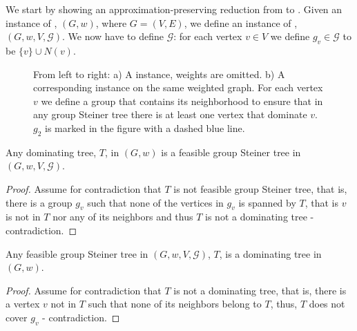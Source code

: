 We start by showing an approximation-preserving reduction from \Prob{} to
\ProbGroup{}.
Given an instance of \Prob{}, $(G, w)$, where $G = (V, E)$, 
we define an instance of \ProbGroup{},
$(G, w, V, \mathcal{G})$.
We now have to define $\mathcal{G}$: for each vertex $v \in V$ we define 
$g_v \in \mathcal{G}$ to be $\{v\} \cup N(v)$.

\begin{figure}
\begin{center}

\end{center}
\caption{\label{fig:prob-leq-group}
From left to right:
a) A \Prob{} instance, weights are omitted.
b) A corresponding \ProbGroup{} instance on the same weighted graph.
For each vertex $v$ we define a group
that contains its neighborhood to ensure that in any group Steiner tree there is at least
one vertex that dominate $v$.
$g_2$ is marked in the figure with a dashed blue line.  
}
\end{figure}

\begin{claim}
Any dominating tree, $T$, in $(G, w)$ is a feasible group Steiner tree in $(G, w, V, \mathcal{G})$.
\end{claim}

\begin{proof}
Assume for contradiction that $T$ is not feasible group Steiner tree, that is, there is 
a group $g_v$ such that none of the vertices in $g_v$ is spanned by $T$, that is $v$
is not in $T$ nor any of its neighbors and thus $T$ is not a dominating tree - contradiction. 
\end{proof}
 
\begin{claim}
Any feasible group Steiner tree in $(G, w, V, \mathcal{G})$, $T$, is a dominating tree
in $(G, w)$.
\end{claim}

\begin{proof}
Assume for contradiction that $T$ is not a dominating tree, that is, there is 
a vertex $v$ not in $T$ such that none of its neighbors belong to $T$, thus, 
$T$ does not cover $g_v$ - contradiction. 
\end{proof}